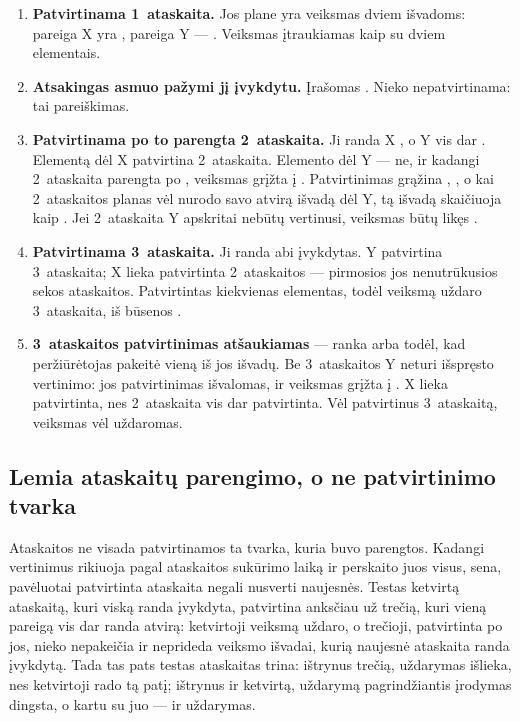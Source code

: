 \begin{enumerate}
  \item \textbf{Patvirtinama 1~ataskaita.} Jos plane yra veiksmas dviem išvadoms: pareiga X yra
    , pareiga Y --- . Veiksmas įtraukiamas kaip  su
    dviem elementais.
  \item \textbf{Atsakingas asmuo pažymi jį įvykdytu.} Įrašomas . Nieko
    nepatvirtinama: tai pareiškimas.
  \item \textbf{Patvirtinama po to parengta 2~ataskaita.} Ji randa X , o Y vis dar
    . Elementą dėl X patvirtina 2~ataskaita. Elemento dėl Y --- ne, ir kadangi
    2~ataskaita parengta po , veiksmas grįžta į . Patvirtinimas
    grąžina , , o kai 2~ataskaitos planas vėl nurodo savo
    atvirą išvadą dėl Y, tą išvadą skaičiuoja kaip . Jei 2~ataskaita Y apskritai nebūtų vertinusi, veiksmas
    būtų likęs .
  \item \textbf{Patvirtinama 3~ataskaita.} Ji randa abi įvykdytas. Y patvirtina 3~ataskaita; X
    lieka patvirtinta 2~ataskaitos --- pirmosios jos nenutrūkusios sekos ataskaitos. Patvirtintas
    kiekvienas elementas, todėl veiksmą uždaro 3~ataskaita, iš būsenos .
  \item \textbf{3~ataskaitos patvirtinimas atšaukiamas} --- ranka arba todėl, kad peržiūrėtojas
    pakeitė vieną iš jos išvadų. Be 3~ataskaitos Y neturi išspręsto vertinimo: jos patvirtinimas
    išvalomas, ir veiksmas grįžta į . X lieka patvirtinta, nes 2~ataskaita vis
    dar patvirtinta. Vėl patvirtinus 3~ataskaitą, veiksmas vėl uždaromas.
\end{enumerate}

\subsection{Lemia ataskaitų parengimo, o ne patvirtinimo tvarka}

Ataskaitos ne visada patvirtinamos ta tvarka, kuria buvo parengtos. Kadangi 
vertinimus rikiuoja pagal ataskaitos sukūrimo laiką ir perskaito juos visus, sena, pavėluotai
patvirtinta ataskaita negali nusverti naujesnės. Testas
 ketvirtą ataskaitą, kuri viską randa
įvykdyta, patvirtina anksčiau už trečią, kuri vieną pareigą vis dar randa atvirą: ketvirtoji
veiksmą uždaro, o trečioji, patvirtinta po jos, nieko nepakeičia ir neprideda veiksmo išvadai,
kurią naujesnė ataskaita randa įvykdytą. Tada tas pats testas ataskaitas trina: ištrynus trečią,
uždarymas išlieka, nes ketvirtoji rado tą patį; ištrynus ir ketvirtą, uždarymą pagrindžiantis
įrodymas dingsta, o kartu su juo --- ir uždarymas.

